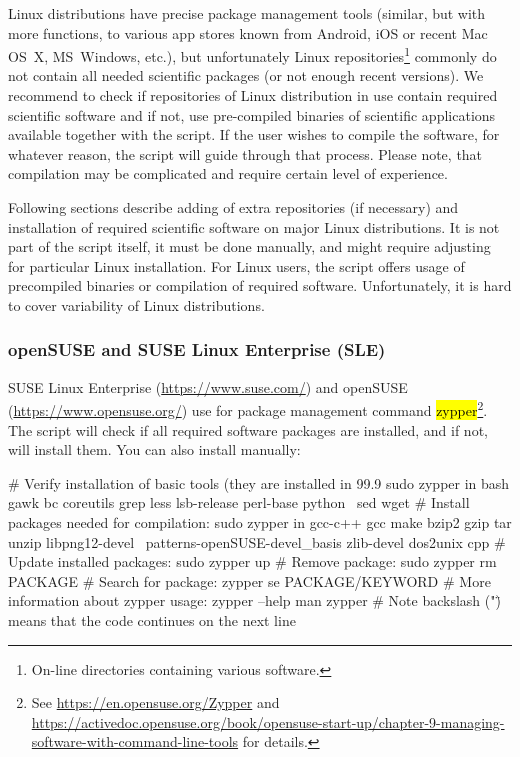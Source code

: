 \documentclass[a4paper, 11pt, twoside]{article}
\renewcommand{\texttt}[1]{\hl{\ttfamily #1}}
\begin{document}
Linux distributions have precise package management tools (similar, but with more functions, to various app stores known from Android, iOS or recent Mac OS~X, MS~Windows, etc.), but unfortunately Linux repositories\footnote{On-line directories containing various software.} commonly do not contain all needed scientific packages (or not enough recent versions). We recommend to check if repositories of Linux distribution in use contain required scientific software and if not, use pre-compiled binaries of scientific applications available together with the script. If the user wishes to compile the software, for whatever reason, the script will guide through that process. Please note, that compilation may be complicated and require certain level of experience.

Following sections describe adding of extra repositories (if necessary) and installation of required scientific software on major Linux distributions. It is not part of the script itself, it must be done manually, and might require adjusting for particular Linux installation. For Linux users, the script offers usage of precompiled binaries or compilation of required software. Unfortunately, it is hard to cover variability of Linux distributions.

\subsubsection{openSUSE and SUSE Linux Enterprise (SLE)}

SUSE Linux Enterprise (\url{https://www.suse.com/}) and openSUSE (\url{https://www.opensuse.org/}) use for package management command \texttt{zypper}\footnote{See \url{https://en.opensuse.org/Zypper} and \url{https://activedoc.opensuse.org/book/opensuse-start-up/chapter-9-managing-software-with-command-line-tools} for details.}. The script will check if all required software packages are installed, and if not, will install them. You can also install manually:

\begin{bashcode}
  # Verify installation of basic tools (they are installed in 99.9%
  sudo zypper in bash gawk bc coreutils grep less lsb-release perl-base python \
    sed wget
  # Install packages needed for compilation:
  sudo zypper in gcc-c++ gcc make bzip2 gzip tar unzip libpng12-devel \
    patterns-openSUSE-devel_basis zlib-devel dos2unix cpp
  # Update installed packages:
  sudo zypper up
  # Remove package:
  sudo zypper rm PACKAGE
  # Search for package:
  zypper se PACKAGE/KEYWORD
  # More information about zypper usage:
  zypper --help
  man zypper
  # Note backslash ("\") means that the code continues on the next line
\end{bashcode}
\end{document}
